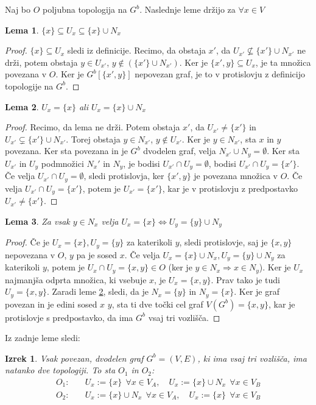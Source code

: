 \documentclass[a4paper, 12pt]{book}
\newtheorem{theorem}{Izrek}[section]
\newtheorem{lemma}{Lema}[section]
\begin{document}
Naj bo $O$ poljubna topologija na $G^b$. Naslednje leme držijo za $\forall x \in V$
\begin{lemma}\label{lem1}
  $\{x\} \subseteq U_x \subseteq \{x\} \cup N_x$
\end{lemma}
\begin{proof}
  $\{x\} \subseteq U_x$ sledi iz definicije. Recimo, da obstaja $x'$, da
  $U_{x'} \nsubseteq \{x'\} \cup N_{x'}$ ne drži, potem obstaja
  $y \in U_{x'}$, $y \notin (\{x'\} \cup N_{x'})$. Ker je $\{x', y\} \subseteq U_x$,
  je ta množica povezana v $O$. Ker je $G^b[\{x',y\}]$ nepovezan graf, je to v
  protislovju z definicijo topologije na $G^b$.
\end{proof}
\begin{lemma}\label{lem2}
  $U_x = \{x\}$ ali $U_x = \{x\} \cup N_x$
\end{lemma}
\begin{proof}
  Recimo, da lema ne drži. Potem obstaja $x'$, da $U_{x'} \neq \{x'\}$ in
  $U_{x'} \subsetneq \{x'\} \cup N_{x'}$. Torej obstaja $y \in N_{x'}$, $y \notin U_{x'}$.
  Ker je $y \in N_{x'}$, sta $x$ in $y$ povezana. Ker sta povezana in je $G^b$
  dvodelen graf, velja $N_{x'} \cup N_y = \emptyset$. Ker sta $U_{x'}$ in $U_y$ 
  podmnožici $N_x'$ in $N_y$, je bodisi $U_{x'} \cap U_y = \emptyset$,
  bodisi $U_{x'} \cap U_y = \{x'\}$. Če velja $U_{x'} \cap U_y = \emptyset$, sledi
  protislovja, ker $\{x',y\}$ je povezana množica v $O$.
  Če velja $U_{x'} \cap U_y = \{x'\}$, potem je $U_{x'} = \{x'\}$, kar je v
  protislovju z predpostavko $U_{x'} \neq \{x'\}$.
\end{proof}
\begin{lemma}\label{lem3}
  Za vsak $y \in N_x$ velja $U_x = \{x\} \iff U_y = \{y\} \cup N_y$
\end{lemma}
\begin{proof}
Če je $U_x = \{x\}, U_y = \{y\}$ za katerikoli $y$, sledi protislovje, saj je 
$\{x,y\}$ nepovezana v $O$, $y$ pa je sosed $x$.
Če velja $U_x = \{x\} \cup N_x, U_y = \{y\} \cup N_y$ za katerikoli $y$, potem je
$U_x \cap U_y = \{x, y\} \in O$ (ker je $y \in N_x \Rightarrow x \in N_y$). Ker je
$U_x$ najmanjša odprta množica, ki vsebuje $x$, je $U_x = \{x,y\}$. Prav tako je
tudi $U_y = \{x,y\}$. Zaradi leme \ref*{lem2}, sledi, da je $N_x = \{y\}$ in $N_y = \{x\}$.
Ker je graf povezan in je edini sosed $x$ $y$, sta ti dve točki cel graf
$V(G^b) = \{x,y\}$, kar je protislovje s predpostavko, da ima $G^b$ vsaj tri vozlišča.
\end{proof}

Iz zadnje leme sledi:
\begin{theorem}
Vsak povezan, dvodelen graf $G^b = (V,E)$, ki ima vsaj tri vozlišča, ima natanko
dve topologiji. To sta $O_1$ in $O_2$:
\[
  \begin{split}
  O_1:&\quad
  U_x:=\{x\}\ \ \forall x \in V_A, \quad
  U_x:=\{x\}\cup N_x\ \  \forall x \in V_B\\
  O_2:&\quad
  U_x:=\{x\}\cup N_x\ \  \forall x \in V_A, \quad
  U_x:=\{x\}\ \ \forall x \in V_B\\
\end{split}
\]
\end{theorem}
\end{document}
